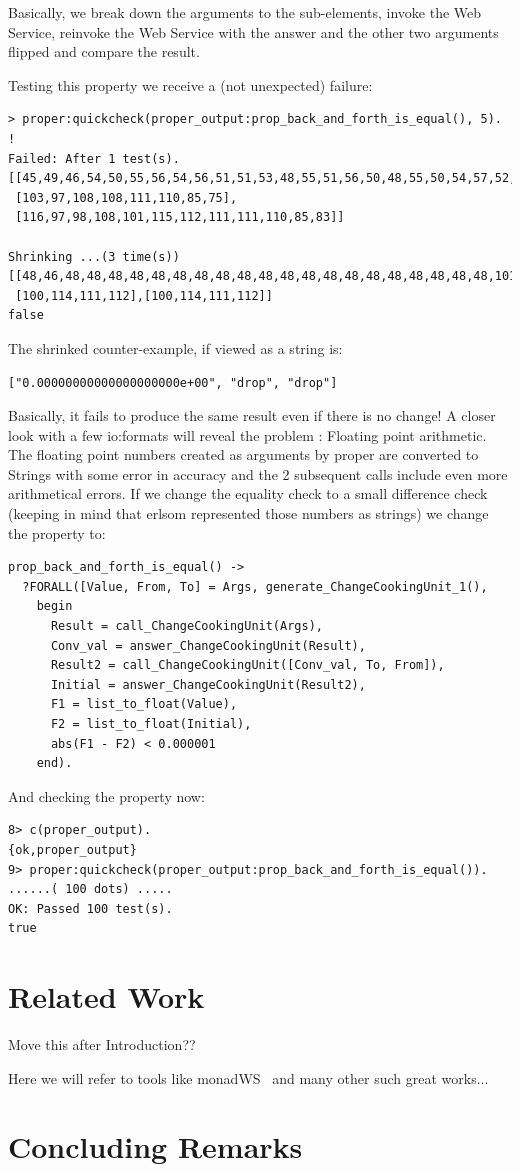 \documentclass[submission,copyright,a4]{eptcs}
\begin{document}
Basically, we break down the arguments to the sub-elements, invoke the Web Service, reinvoke the Web Service with the answer and the other two arguments flipped and compare the result. 

Testing this property we receive a (not unexpected) failure:

\begin{lstlisting}
> proper:quickcheck(proper_output:prop_back_and_forth_is_equal(), 5).
!
Failed: After 1 test(s).
[[45,49,46,54,50,55,56,54,56,51,51,53,48,55,51,56,50,48,55,50,54,57,52,101,45,48,49],
 [103,97,108,108,111,110,85,75],
 [116,97,98,108,101,115,112,111,111,110,85,83]]

Shrinking ...(3 time(s))
[[48,46,48,48,48,48,48,48,48,48,48,48,48,48,48,48,48,48,48,48,48,48,101,43,48,48],
 [100,114,111,112],[100,114,111,112]]
false
\end{lstlisting}

The shrinked counter-example, if viewed as a string is:

\begin{lstlisting}
["0.00000000000000000000e+00", "drop", "drop"]
\end{lstlisting}

Basically, it fails to produce the same result even if there is no change! A closer look with a few io:formats will reveal the problem : Floating point arithmetic. The floating point numbers created as arguments by proper are converted to Strings with some error in accuracy and the 2 subsequent calls include even more arithmetical errors. If we change the equality check to a small difference check (keeping in mind that erlsom represented those numbers as strings) we change the property to:

\begin{lstlisting}
prop_back_and_forth_is_equal() ->
  ?FORALL([Value, From, To] = Args, generate_ChangeCookingUnit_1(),
    begin
      Result = call_ChangeCookingUnit(Args),
      Conv_val = answer_ChangeCookingUnit(Result),
      Result2 = call_ChangeCookingUnit([Conv_val, To, From]),
      Initial = answer_ChangeCookingUnit(Result2),
      F1 = list_to_float(Value),
      F2 = list_to_float(Initial),
      abs(F1 - F2) < 0.000001
    end).
\end{lstlisting}

And checking the property now:

\begin{lstlisting}
8> c(proper_output).                                                  
{ok,proper_output}
9> proper:quickcheck(proper_output:prop_back_and_forth_is_equal()).
......( 100 dots) .....
OK: Passed 100 test(s).
true
\end{lstlisting}

\section{Related Work}
Move this after Introduction??

Here we will refer to tools like monadWS~\cite{monadWS@AST-11} and
many other such great works...

\section{Concluding Remarks}



\end{document}
